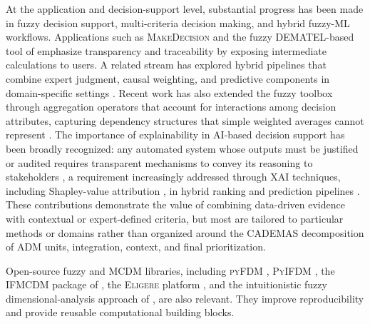 \documentclass{interact}
\begin{document}
At the application and decision-support level, substantial progress has been made in fuzzy decision support, multi-criteria decision making, and hybrid fuzzy-ML workflows. Applications such as \textsc{MakeDecision} \citep{Wieckowski2024} and the fuzzy DEMATEL-based tool of \citet{Chekry2024} emphasize transparency and traceability by exposing intermediate calculations to users. A related stream has explored hybrid pipelines that combine expert judgment, causal weighting, and predictive components in domain-specific settings \citep{Abdulgader2018,Sahraei2022,Ozkurt2025}. Recent work has also extended the fuzzy toolbox through aggregation operators that account for interactions among decision attributes, capturing dependency structures that simple weighted averages cannot represent \citep{Kacprzyk2022}. The importance of explainability in AI-based decision support has been broadly recognized: any automated system whose outputs must be justified or audited requires transparent mechanisms to convey its reasoning to stakeholders \citep{Arrieta2020}, a requirement increasingly addressed through XAI techniques, including Shapley-value attribution \citep{Lundberg2017,Li2024}, in hybrid ranking and prediction pipelines \citep{Ozkurt2025}. These contributions demonstrate the value of combining data-driven evidence with contextual or expert-defined criteria, but most are tailored to particular methods or domains rather than organized around the CADEMAS decomposition of ADM units, integration, context, and final prioritization.

Open-source fuzzy and MCDM libraries, including \textsc{pyFDM} \citep{Wieckowski2022}, \textsc{PyIFDM} \citep{Wieckowski2023}, the \textsc{IFMCDM} package of \citet{Roszkowska2024}, the \textsc{Eligere} platform \citep{Grazioso2023}, and the intuitionistic fuzzy dimensional-analysis approach of \citet{PerezDominguez2024}, are also relevant. They improve reproducibility and provide reusable computational building blocks.
\end{document}

